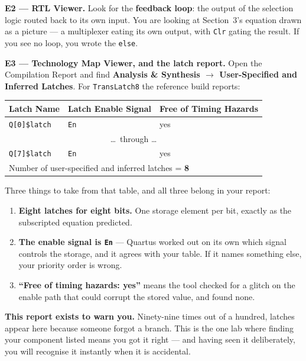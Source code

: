 \documentclass[11pt]{article}
\newcommand{\code}[1]{\texttt{#1}}
\begin{document}
\vspace{4pt}
\textbf{E2 --- RTL Viewer.} Look for the \textbf{feedback loop}: the output of the
selection logic routed back to its own input. You are looking at Section~3's
equation drawn as a picture --- a multiplexer eating its own output, with
\code{Clr} gating the result. If you see no loop, you wrote the \code{else}.

\vspace{4pt}
\textbf{E3 --- Technology Map Viewer, and the latch report.} Open the Compilation
Report and find \textbf{Analysis \& Synthesis $\rightarrow$ User-Specified and
Inferred Latches}. For \code{TransLatch8} the reference build reports:

\begin{center}
\begin{tabular}{lll}
\toprule
Latch Name & Latch Enable Signal & Free of Timing Hazards \\
\midrule
\code{Q[0]\$latch} & \code{En} & yes \\
\multicolumn{3}{c}{\ldots\ through \ldots} \\
\code{Q[7]\$latch} & \code{En} & yes \\
\midrule
\multicolumn{3}{l}{Number of user-specified and inferred latches = \textbf{8}} \\
\bottomrule
\end{tabular}
\end{center}

Three things to take from that table, and all three belong in your report:

\begin{enumerate}[leftmargin=2em,itemsep=1pt]
\item \textbf{Eight latches for eight bits.} One storage element per bit, exactly as
the subscripted equation predicted.
\item \textbf{The enable signal is \code{En}} --- Quartus worked out on its own which
signal controls the storage, and it agrees with your table. If it names something
else, your priority order is wrong.
\item \textbf{``Free of timing hazards: yes''} means the tool checked for a glitch on
the enable path that could corrupt the stored value, and found none.
\end{enumerate}

\textbf{This report exists to warn you.} Ninety-nine times out of a hundred, latches
appear here because someone forgot a branch. This is the one lab where finding your
component listed means you got it right --- and having seen it deliberately, you will
recognise it instantly when it is accidental.
\end{document}
